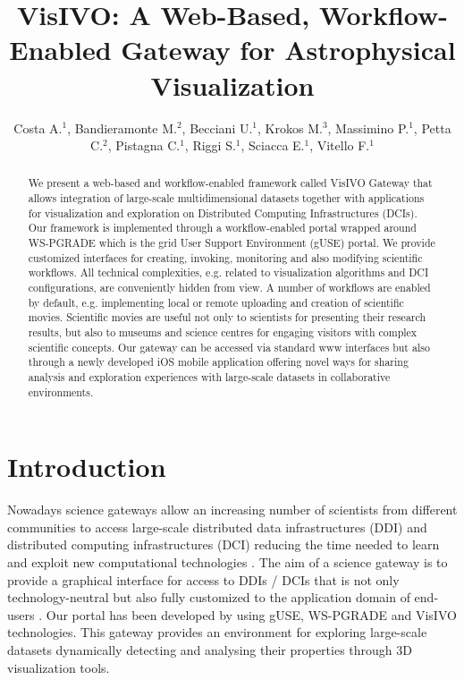 \documentclass[11pt,twoside]{article}
\begin{document}
\title{VisIVO: A Web-Based, Workflow-Enabled Gateway for Astrophysical Visualization}
\author{Costa A.$^1$, Bandieramonte M.$^2$, Becciani U.$^1$, Krokos M.$^3$, Massimino P.$^1$, Petta C.$^2$, Pistagna C.$^1$, Riggi S.$^1$, Sciacca E.$^1$, Vitello F.$^1$}

\begin{abstract}
We present a web-based and workflow-enabled framework called VisIVO Gateway that allows integration of large-scale multidimensional datasets together with applications for visualization and exploration on Distributed Computing Infrastructures (DCIs).
Our framework is implemented through a workflow-enabled portal wrapped around WS-PGRADE which is the grid User Support Environment (gUSE) portal.  We provide customized interfaces for creating, invoking, monitoring and also modifying scientific workflows. All technical complexities, e.g. related to visualization algorithms and DCI configurations, are conveniently hidden from view.
A number of workflows are enabled by default, e.g. implementing local or remote uploading and creation of scientific movies. Scientific movies are useful not only to scientists for presenting their research results, but also to museums and science centres for engaging visitors with complex scientific concepts.
Our gateway can be accessed via standard www interfaces but also through a newly developed iOS mobile application offering novel ways for sharing analysis and exploration experiences with large-scale datasets in collaborative environments.
\end{abstract}

\section{Introduction}
Nowadays science gateways allow an increasing number of scientists from different communities to access large-scale distributed data infrastructures (DDI) and distributed computing infrastructures (DCI) reducing the time needed to learn and exploit new computational technologies \citep{borkin2011visualization}. The aim of a science gateway is to provide a graphical interface for access to DDIs / DCIs that is not only technology-neutral but also fully customized to the application domain of end-users \citep{abt_1990}. Our portal has been developed by using gUSE, WS-PGRADE  \citep{kacsuk2011p}  and VisIVO \citep{becciani2010visivo} technologies. This gateway provides an environment for exploring large-scale datasets dynamically detecting and analysing their properties through 3D visualization tools. 
\end{document}
